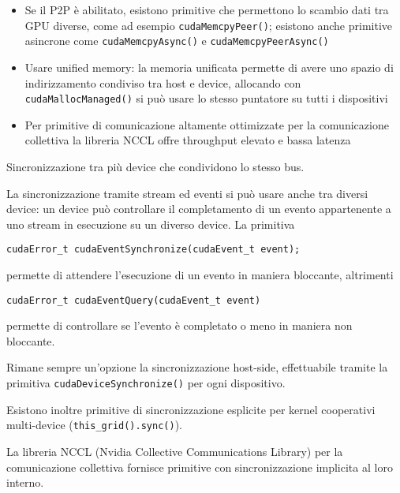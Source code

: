 \begin{questions}
\begin{solution}
\begin{itemize}
            \item Se il P2P è abilitato, esistono primitive che permettono lo scambio dati tra GPU diverse, come ad esempio \texttt{cudaMemcpyPeer()}; esistono anche primitive asincrone come \texttt{cudaMemcpyAsync()} e \texttt{cudaMemcpyPeerAsync()}
            
            \item Usare unified memory: la memoria unificata permette di avere uno spazio di indirizzamento condiviso tra host e device, allocando con \texttt{cudaMallocManaged()} si può usare lo stesso puntatore su tutti i dispositivi
            
            \item Per primitive di comunicazione altamente ottimizzate per la comunicazione collettiva la libreria NCCL offre throughput elevato e bassa latenza
        \end{itemize}
    \end{solution}
    
    \question Sincronizzazione tra più device che condividono lo stesso bus.
    
    \begin{solution}
        La sincronizzazione tramite stream ed eventi si può usare anche tra diversi device: un device può controllare il completamento di un evento appartenente a uno stream in esecuzione su un diverso device. La primitiva
        \begin{verbatim}
cudaError_t cudaEventSynchronize(cudaEvent_t event);
        \end{verbatim}
        permette di attendere l'esecuzione di un evento in maniera bloccante, altrimenti
        \begin{verbatim}
cudaError_t cudaEventQuery(cudaEvent_t event)
        \end{verbatim}
        permette di controllare se l'evento è completato o meno in maniera non bloccante.
        
        Rimane sempre un'opzione la sincronizzazione host-side, effettuabile tramite la primitiva \texttt{cudaDeviceSynchronize()} per ogni dispositivo.
        
        Esistono inoltre primitive di sincronizzazione esplicite per kernel cooperativi multi-device (\texttt{this\_grid().sync()}).
        
        La libreria NCCL (Nvidia Collective Communications Library) per la comunicazione collettiva fornisce primitive con sincronizzazione implicita al loro interno.
    \end{solution}
    

\end{questions}
